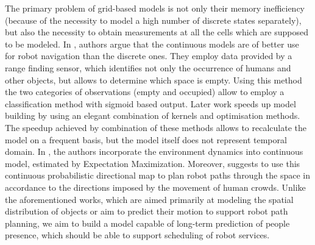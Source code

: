 The primary problem of grid-based models is not only their memory inefficiency (because of the necessity to model a high number of discrete states separately), but also the necessity to obtain measurements at all the cells which are supposed to be modeled. 
In \cite{o2012gaussian}, authors argue that the continuous models are of better use for robot navigation than the discrete ones.
They employ data provided by a range finding sensor, which identifies not only the occurrence of humans and other objects, but allows to determine which space is empty.
Using this method the two categories of observations (empty and occupied) allow to employ a classification method with sigmoid based output.
Later work \cite{ramos2016hilbert} speeds up model building by using an elegant combination of kernels and optimisation methods.
The speedup achieved by combination of these methods allows to recalculate the model on a frequent basis, but the model itself does not represent temporal domain.
In \cite{kucner2017enabling}, the authors incorporate the environment dynamics into continuous model, estimated by Expectation Maximization.
Moreover, \cite{kucner2017enabling} suggests to use this continuous probabilistic directional map to plan robot paths through the space in accordance to the directions imposed by the movement of human crowds.
Unlike the aforementioned works, which are aimed primarily at modeling the spatial distribution of objects or aim to predict their motion to support robot path planning, we aim to build a model capable of long-term prediction of people presence, which should be able to support scheduling of robot services. 